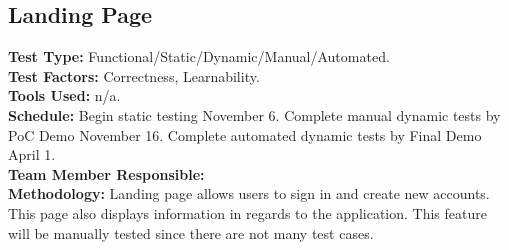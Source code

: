 \documentclass[12pt]{article}
\begin{document}
\subsection{Landing Page}
\textbf{Test Type:} Functional/Static/Dynamic/Manual/Automated. \\
\textbf{Test Factors:} Correctness, Learnability. \\
\textbf{Tools Used:} n/a. \\
\textbf{Schedule:} Begin static testing November 6. Complete manual dynamic tests by PoC Demo November 16. Complete automated dynamic tests by Final Demo April 1. \\
\textbf{Team Member Responsible:} \\
\textbf{Methodology:} Landing page allows users to sign in and create new accounts. This page also displays information in regards to the application. This feature will be manually tested since there are not many test cases.
\end{document}
